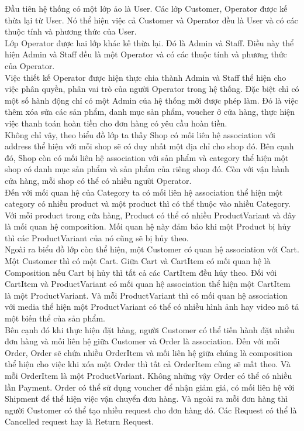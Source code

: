 Đầu tiên hệ thống có một lớp ảo là User. Các lớp Customer, Operator được kế thừa lại từ User. Nó thể hiện việc cả Customer và Operator đều là User và có các thuộc tính và phương thức của User. \\

Lớp Operator được hai lớp khác kế thừa lại. Đó là Admin và Staff. Điều này thể hiện Admin và Staff đều là một Operator và có các thuộc tính và phương thức của Operator. \\

Việc thiết kế Operator được hiện thực chia thành Admin và Staff thể hiện cho việc phân quyền, phân vai trò của người Operator trong hệ thống. Đặc biệt chỉ có một số hành động chỉ có một Admin của hệ thống mới được phép làm. Đó là việc thêm xóa sửa các sản phẩm, danh mục sản phẩm, voucher ở cửa hàng, thực hiện việc thanh toán hoàn tiền cho đơn hàng có yêu cầu hoàn tiền. \\

Không chỉ vậy, theo biểu đồ lớp ta thấy Shop có mối liên hệ association với address thể hiện với mỗi shop sẽ có duy nhất một địa chỉ cho shop đó. Bên cạnh đó, Shop còn có mối liên hệ association với sản phẩm và category thể hiện một shop có danh mục sản phẩm và sản phẩm của riêng shop đó. Còn với vận hành cửa hàng, mỗi shop có thể có nhiều người Operator.\\

Đến với mối quan hệ của Category ta có mối liên hệ association thể hiện một category có nhiều product và một product thì có thể thuộc vào nhiều Category. \\

Với mỗi product trong cửa hàng, Product có thể có nhiều ProductVariant và đây là mối quan hệ composition. Mối quan hệ này đảm bảo khi một Product bị hủy thì các ProductVariant của nó cũng sẽ bị hủy theo. \\

Ngoài ra biểu đồ lớp còn thể hiện, một Customer có quan hệ association với Cart. Một Customer thì có một Cart. Giữa Cart và CartItem có mối quan hệ là Composition nếu Cart bị hủy thì tất cả các CartItem đều hủy theo. Đối với CartItem và ProductVariant có mối quan hệ association thể hiện một CartItem là một ProductVariant. Và mỗi ProductVariant thì có mối quan hệ association với media thể hiện một ProductVariant có thể có nhiều hình ảnh hay video mô tả một biến thể của sản phẩm. \\

Bên cạnh đó khi thực hiện đặt hàng, người Customer có thể tiến hành đặt nhiều đơn hàng và mối liên hệ giữa Customer và Order là association. Đến với mỗi Order, Order sẽ chứa nhiều OrderItem và mối liên hệ giữa chúng là composition thể hiện cho việc khi xóa một Order thì tất cả OrderItem cũng sẽ mất theo. Và mỗi OrderItem là một ProductVariant. Không những vậy Order có thể có nhiều lần Payment. Order có thể sử dụng voucher để nhận giảm giá, có mối liên hệ với Shipment để thể hiện việc vận chuyển đơn hàng. Và ngoài ra mỗi đơn hàng thì người Customer có thể tạo nhiều request cho đơn hàng đó. Các Request có thể là Cancelled request hay là Return Request. \\


